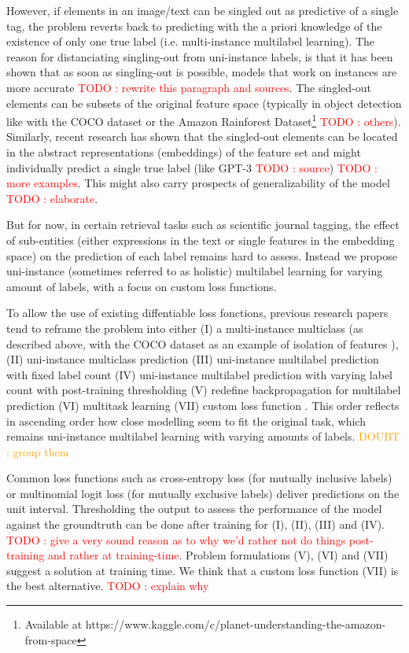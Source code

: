 \documentclass[sigconf,natbib,screen=true,review=true,anonymous]{acmart}
\newcommand\todo[1]{\textcolor{red}{TODO : #1}}
\newcommand\doubt[1]{\textcolor{orange}{DOUBT : #1}}
\begin{document}
However, if elements in an image/text can be singled out as predictive of a single tag, the problem reverts back to predicting with the a priori knowledge of the existence of only one true label (i.e. multi-instance multilabel learning).  The reason for distanciating singling-out from uni-instance labels, is that it has been shown that as soon as singling-out is possible, models that work on instances are more accurate \todo{rewrite this paragraph and sources}. The singled-out elements can be subsets of the original feature space (typically in object detection like with the COCO dataset  \cite{COCO} or the Amazon Rainforest Dataset\footnote{Available at https://www.kaggle.com/c/planet-understanding-the-amazon-from-space} \todo{others}). Similarly, recent research has shown that the singled-out elements can be located in the abstract representations (embeddings) of the feature set and might individually predict a single true label (like GPT-3 \todo{source}) \todo{more examples}. This might also carry prospects of generalizability of the model \cite{generalization} \todo{elaborate}. 

But for now, in certain retrieval tasks such as scientific journal tagging, the effect of sub-entities (either expressions in the text or single features in the embedding space) on the prediction of each label remains hard to assess. Instead we propose uni-instance (sometimes referred to as holistic) multilabel learning for varying amount of labels, with a focus on custom loss functions.

To allow the use of existing diffentiable loss fonctions, previous research papers tend to reframe the problem into either (I) a multi-instance multiclass (as described above, with the COCO dataset as an example of isolation of features \cite{COCO}), (II) uni-instance multiclass prediction (III) uni-instance multilabel prediction with fixed label count (IV) uni-instance multilabel prediction with varying label count with post-training thresholding (V) redefine backpropagation for multilabel prediction \cite{multilabelBackprop} (VI) multitask learning \cite{multitaskLabel} (VII) custom loss function \cite{tencent}. This order reflects in ascending order how close modelling seem to fit the original task, which remains uni-instance multilabel learning with varying amounts of labels. \doubt{group them}

Common loss functions such as cross-entropy loss (for mutually inclusive labels) or multinomial logit loss (for mutually exclusive labels) deliver predictions on the unit interval. Thresholding the output to assess the performance of the model against the groundtruth can be done after training for (I), (II), (III) and (IV). \todo{give a very sound reason as to why we'd rather not do things post-training and rather at training-time}. Problem formulations (V), (VI) and (VII) suggest a solution at training time. We think that a custom loss function (VII) is the best alternative. \todo{explain why}
\end{document}
